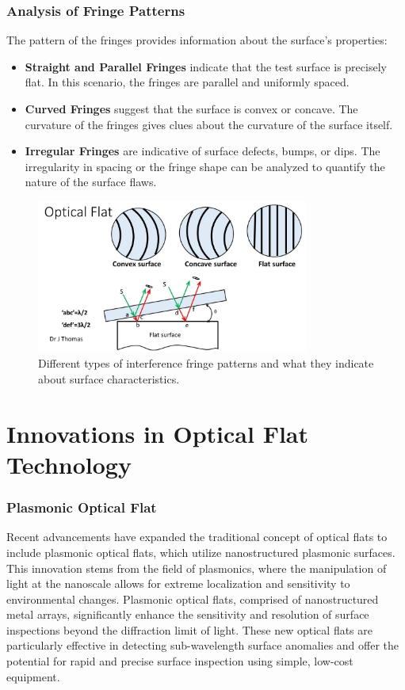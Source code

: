 \documentclass[../main.tex]{subfiles}
\begin{document}
\subsubsection{Analysis of Fringe Patterns}
The pattern of the fringes provides information about the surface's properties:
\begin{itemize}
    \item \textbf{Straight and Parallel Fringes} indicate that the test surface is precisely flat. In this scenario, the fringes are parallel and uniformly spaced.
    \item \textbf{Curved Fringes} suggest that the surface is convex or concave. The curvature of the fringes gives clues about the curvature of the surface itself.
    \item \textbf{Irregular Fringes} are indicative of surface defects, bumps, or dips. The irregularity in spacing or the fringe shape can be analyzed to quantify the nature of the surface flaws.
\end{itemize}

\begin{frame}{}
    \begin{figure}[H]
    \centering
    \includegraphics[width=0.8\textwidth]{Images/Introduction/fringe_types}
    \caption{Different types of interference fringe patterns and what they indicate about surface characteristics.\cite{Joji_2023}}
    \label{fig:fringe-types}
    \end{figure}
\end{frame}

\section{Innovations in Optical Flat Technology}
\subsubsection{Plasmonic Optical Flat}
Recent advancements have expanded the traditional concept of optical flats to include plasmonic optical flats, which utilize nanostructured plasmonic surfaces. This innovation stems from the field of plasmonics, where the manipulation of light at the nanoscale allows for extreme localization and sensitivity to environmental changes. Plasmonic optical flats, comprised of nanostructured metal arrays, significantly enhance the sensitivity and resolution of surface inspections beyond the diffraction limit of light. These new optical flats are particularly effective in detecting sub-wavelength surface anomalies and offer the potential for rapid and precise surface inspection using simple, low-cost equipment.\cite{WOS:000387461800007}
\end{document}
